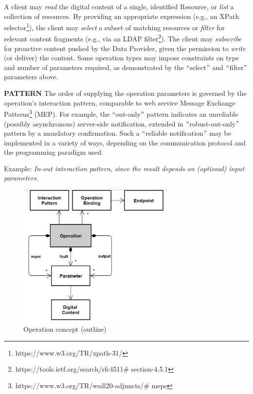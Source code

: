 


A client may\textit{ read} the digital content of a single, identified Resource, or \textit{list} a collection of resources. By providing an appropriate expression (e.g., an XPath selector\footnote{https://www.w3.org/TR/xpath-31/ }), the client may \textit{select } a subset of matching resources or \textit{filter } for relevant content fragments (e.g., via an LDAP filter\footnote{https://tools.ietf.org/search/rfc4511$\#$ section-4.5.1 }). The client may \textit{subscribe} for proactive content pushed by the Data Provider, given the permission to \textit{write} (or deliver) the content. Some operation types may impose constraints on type and number of parameters required, as demonstrated by the $``$select$"$  and $``$filter$"$  parameters above.

\textbf{PATTERN }The order of supplying the operation parameters is governed by the operation’s interaction pattern, comparable to web service Message Exchange Patterns\footnote{https://www.w3.org/TR/wsdl20-adjuncts/$\#$ meps } (MEP). For example, the $``$out-only$"$  pattern indicates an unreliable (possibly asynchronous) server-side notification, extended in $``$robust-out-only$"$  pattern by a mandatory confirmation. Such a $``$reliable notification$"$  may be implemented in a variety of ways, depending on the communication protocol and the programming paradigm used.

Example: \textit{In-out interaction pattern, since the result depends on (optional) input parameters}.



\begin{figure}[H]
	\begin{Center}
		\includegraphics[width=3.08in,height=2.84in]{./media/image41.png}
		\caption{Operation concept (outline)}
		\label{fig:Operation_concept_outline}
	\end{Center}
\end{figure}


